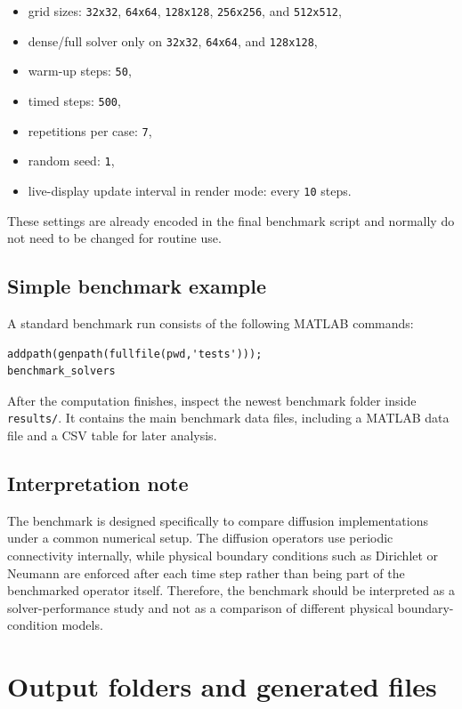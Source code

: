 \begin{itemize}
    \item grid sizes: \texttt{32x32}, \texttt{64x64}, \texttt{128x128}, \texttt{256x256}, and \texttt{512x512},
    \item dense/full solver only on \texttt{32x32}, \texttt{64x64}, and \texttt{128x128},
    \item warm-up steps: \texttt{50},
    \item timed steps: \texttt{500},
    \item repetitions per case: \texttt{7},
    \item random seed: \texttt{1},
    \item live-display update interval in render mode: every \texttt{10} steps.
\end{itemize}

These settings are already encoded in the final benchmark script and normally do not need to be changed for routine use.

\subsection*{Simple benchmark example}

A standard benchmark run consists of the following MATLAB commands:

\begin{verbatim}
addpath(genpath(fullfile(pwd,'tests')));
benchmark_solvers
\end{verbatim}

After the computation finishes, inspect the newest benchmark folder inside \texttt{results/}. It contains the main benchmark data files, including a MATLAB data file and a CSV table for later analysis.

\subsection*{Interpretation note}

The benchmark is designed specifically to compare diffusion implementations under a common numerical setup. The diffusion operators use periodic connectivity internally, while physical boundary conditions such as Dirichlet or Neumann are enforced after each time step rather than being part of the benchmarked operator itself. Therefore, the benchmark should be interpreted as a solver-performance study and not as a comparison of different physical boundary-condition models.

\section{Output folders and generated files}
\label{sec:manual_outputs}

